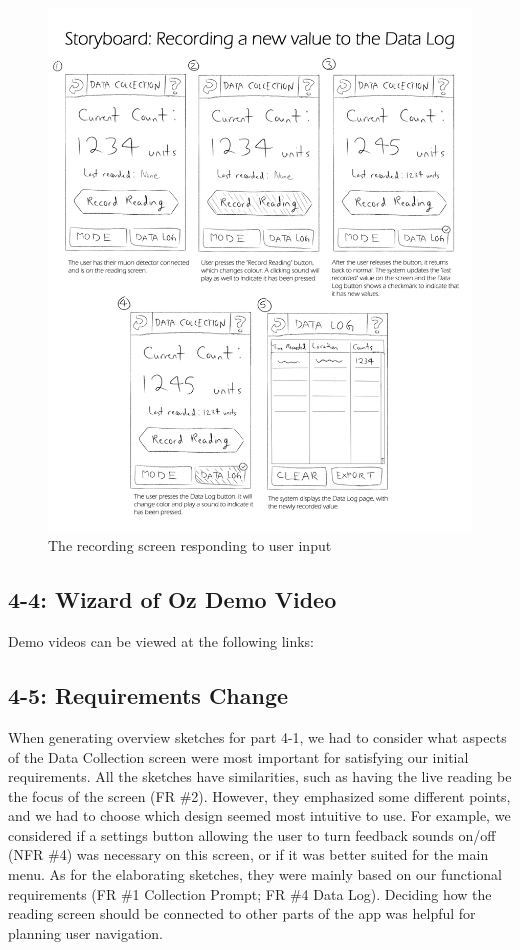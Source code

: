 \documentclass[11pt,a4paper]{article}
\begin{document}
\bigskip
\begin{figure}[h]
  \centering
  \hspace*{-0.5cm}
      \includegraphics[width=1.15\textwidth]{storyboard.png}
  \caption{The recording screen responding to user input}
\end{figure}

\newpage
\subsection*{4-4: Wizard of Oz Demo Video}

Demo videos can be viewed at the following links:


\subsection*{4-5: Requirements Change}

When generating overview sketches for part 4-1, we had to consider what aspects of the Data Collection screen were most important for satisfying our initial requirements. All the sketches have similarities, such as having the live reading be the focus of the screen (FR \#2). However, they emphasized some different points, and we had to choose which design seemed most intuitive to use. For example, we considered if a settings button allowing the user to turn feedback sounds on/off (NFR \#4) was necessary on this screen, or if it was better suited for the main menu. As for the elaborating sketches, they were mainly based on our functional requirements (FR \#1 Collection Prompt; FR \#4 Data Log).  Deciding how the reading screen should be connected to other parts of the app was helpful for planning user navigation.
\end{document}

